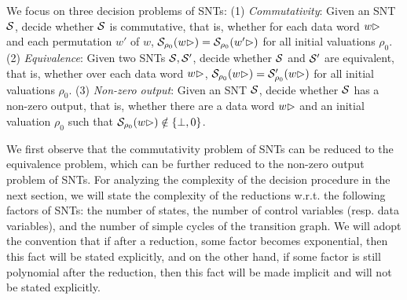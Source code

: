 We focus on three decision problems of SNTs: (1) \emph{Commutativity}: Given an SNT ${\mathcal{S} }$, decide whether ${\mathcal{S} }$ is commutative, that is, whether for each data word $w\rhd$ and each permutation $w'$ of $w$, ${\mathcal{S} }_{\rho_0}(w\rhd)={\mathcal{S} }_{\rho_0}(w'\rhd)$ for all initial valuations $\rho_0$. (2) \emph{Equivalence}: Given two SNTs ${\mathcal{S} },{\mathcal{S} }'$, decide whether ${\mathcal{S} }$ and ${\mathcal{S} }'$ are equivalent, that is, whether over each data word $w\rhd$, ${\mathcal{S} }_{\rho_0}(w\rhd)={\mathcal{S} }'_{\rho_0}(w\rhd)$ for all initial valuations $\rho_0$. (3) \emph{Non-zero output}: Given an SNT ${\mathcal{S} }$, decide whether ${\mathcal{S} }$ has a non-zero output, that is, whether there are a data word $w\rhd$ and an initial valuation $\rho_0$ such that ${\mathcal{S} }_{\rho_0}(w\rhd)\notin \{\bot, 0\}$. 

We first observe that the commutativity problem of SNTs can be reduced to the equivalence problem, which can be further reduced to the non-zero output problem of SNTs. For analyzing the complexity of the decision procedure in the next section,  we will state the complexity of the reductions w.r.t. the following factors of SNTs: the number of states, the number of control variables (resp. data variables), and the number of simple cycles of the transition graph. We will adopt the convention that if after a reduction, some factor becomes exponential, then this fact will be stated explicitly, and on the other hand, if some factor is still polynomial after the reduction, then this fact will be made implicit and will not be stated explicitly. 

